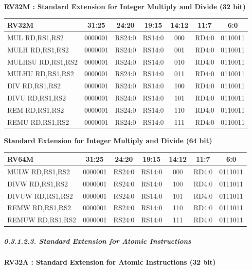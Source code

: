 \documentclass[
]{article}
\begin{document}
\textbf{RV32M : Standard Extension for Integer Multiply and Divide (32
bit)}

\begin{longtable}[]{@{}lcccccc@{}}
\toprule
RV32M & 31:25 & 24:20 & 19:15 & 14:12 & 11:7 & 6:0\tabularnewline
\midrule
\endhead
MUL RD,RS1,RS2 & 0000001 & RS24:0 & RS14:0 & 000 & RD4:0 &
0110011\tabularnewline
MULH RD,RS1,RS2 & 0000001 & RS24:0 & RS14:0 & 001 & RD4:0 &
0110011\tabularnewline
MULHSU RD,RS1,RS2 & 0000001 & RS24:0 & RS14:0 & 010 & RD4:0 &
0110011\tabularnewline
MULHU RD,RS1,RS2 & 0000001 & RS24:0 & RS14:0 & 011 & RD4:0 &
0110011\tabularnewline
DIV RD,RS1,RS2 & 0000001 & RS24:0 & RS14:0 & 100 & RD4:0 &
0110011\tabularnewline
DIVU RD,RS1,RS2 & 0000001 & RS24:0 & RS14:0 & 101 & RD4:0 &
0110011\tabularnewline
REM RD,RS1,RS2 & 0000001 & RS24:0 & RS14:0 & 110 & RD4:0 &
0110011\tabularnewline
REMU RD,RS1,RS2 & 0000001 & RS24:0 & RS14:0 & 111 & RD4:0 &
0110011\tabularnewline
\bottomrule
\end{longtable}

\textbf{Standard Extension for Integer Multiply and Divide (64 bit)}

\begin{longtable}[]{@{}lcccccc@{}}
\toprule
RV64M & 31:25 & 24:20 & 19:15 & 14:12 & 11:7 & 6:0\tabularnewline
\midrule
\endhead
MULW RD,RS1,RS2 & 0000001 & RS24:0 & RS14:0 & 000 & RD4:0 &
0111011\tabularnewline
DIVW RD,RS1,RS2 & 0000001 & RS24:0 & RS14:0 & 100 & RD4:0 &
0111011\tabularnewline
DIVUW RD,RS1,RS2 & 0000001 & RS24:0 & RS14:0 & 101 & RD4:0 &
0111011\tabularnewline
REMW RD,RS1,RS2 & 0000001 & RS24:0 & RS14:0 & 110 & RD4:0 &
0111011\tabularnewline
REMUW RD,RS1,RS2 & 0000001 & RS24:0 & RS14:0 & 111 & RD4:0 &
0111011\tabularnewline
\bottomrule
\end{longtable}

\hypertarget{standard-extension-for-atomic-instructions-1}{%
\subparagraph{0.3.1.2.3. Standard Extension for Atomic
Instructions}\label{standard-extension-for-atomic-instructions-1}}

\textbf{RV32A : Standard Extension for Atomic Instructions (32 bit)}
\end{document}
